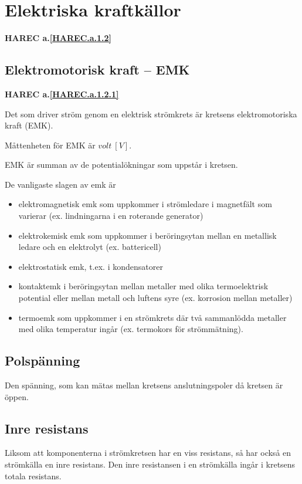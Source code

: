 \section{Elektriska kraftkällor}
\textbf{HAREC a.\ref{HAREC.a.1.2}\label{myHAREC.a.1.2}}

\subsection{Elektromotorisk kraft -- EMK}
\textbf{HAREC a.\ref{HAREC.a.1.2.1}\label{myHAREC.a.1.2.1}}

Det som driver ström genom en elektrisk strömkrets är kretsens elektromotoriska
kraft (EMK).

Måttenheten för EMK är \(volt\ [V]\).

EMK är summan av de potentialökningar som uppstår i kretsen.

De vanligaste slagen av emk är
\begin{itemize}
\item elektromagnetisk emk som uppkommer i strömledare i magnetfält som
varierar (ex. lindningarna i en roterande generator)
\item elektrokemisk emk som uppkommer i beröringsytan mellan en metallisk
ledare och en elektrolyt (ex. battericell)
\item elektrostatisk emk, t.ex. i kondensatorer
\item kontaktemk i beröringsytan mellan metaller med olika termoelektrisk
potential eller mellan metall och luftens syre (ex. korrosion mellan metaller)
\item termoemk som uppkommer i en strömkrets där två sammanlödda metaller med
olika temperatur ingår (ex. termokors för strömmätning).
\end{itemize}

\subsection{Polspänning}

Den spänning, som kan mätas mellan kretsens anslutningspoler då kretsen är öppen.

\subsection{Inre resistans}

Liksom att komponenterna i strömkretsen har en viss resistans, så har också en
strömkälla en inre resistans.
Den inre resistansen i en strömkälla ingår i kretsens totala resistans.

